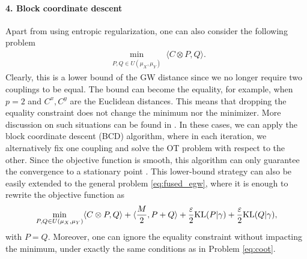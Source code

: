 \paragraph{4. Block coordinate descent} Apart from using entropic regularization,
one can also consider the following problem
\begin{align}
  \label{eq:coot}
  \min_{\substack{P, Q \in U(\mu_X, \mu_Y)}} \langle C \otimes P, Q \rangle.
\end{align}
Clearly, this is a lower bound of the GW distance since we no longer require two couplings to be equal.
The bound can become the equality, for example, when $p=2$ and $C^x, C^y$ are the Euclidean distances.
This means that dropping the equality constraint does not change the minimum nor the minimizer.
More discussion on such situations can be found in .
In these cases, we can apply the block coordinate descent (BCD) algorithm,
where in each iteration, we alternatively fix one coupling and solve the OT problem
with respect to the other. Since the objective function is smooth,
this algorithm can only guarantee the convergence to a stationary point \citep{Tseng01}.
This lower-bound strategy can also be easily extended to the general problem \ref{eq:fused_egw},
where it is enough to rewrite the objective function as
\begin{align}
  \min_{\substack{P, Q \in U(\mu_X, \mu_Y)}} \langle C \otimes P, Q \rangle
  + \langle \frac{M}{2}, P + Q \rangle + \frac{\varepsilon}{2} \text{KL}(P | \gamma)
  + \frac{\varepsilon}{2} \text{KL}(Q | \gamma),
\end{align}
with $P = Q$. Moreover, one can ignore the equality constraint without impacting the minimum,
under exactly the same conditions as in Problem \ref{eq:coot}.

